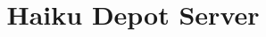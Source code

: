 \documentclass[a4paper,11pt]{article}
\begin{document}
\title{Haiku Depot Server}

\maketitle

\pagebreak









\end{document}
